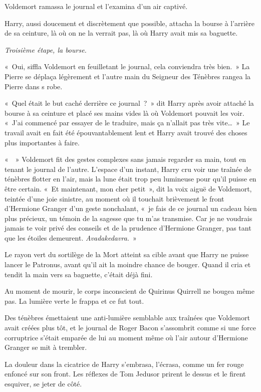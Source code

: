 Voldemort ramassa le journal et l'examina d'un air captivé.

Harry, aussi doucement et discrètement que possible, attacha la bourse à l'arrière de sa ceinture, là où on ne la verrait pas, là où Harry avait mis sa baguette.

\emph{Troisième étape, la bourse.}

«~Oui, siffla Voldemort en feuilletant le journal, cela conviendra très bien.~» La Pierre se déplaça légèrement et l'autre main du Seigneur des Ténèbres rangea la Pierre dans s robe.

«~Quel était le but caché derrière ce journal~?~» dit Harry après avoir attaché la bourse à sa ceinture et placé ses mains vides là où Voldemort pouvait les voir. «~J'ai commencé par essayer de le traduire, mais ça n'allait pas très vite…~» Le travail avait en fait été épouvantablement lent et Harry avait trouvé des choses plus importantes à faire.

«~~» Voldemort fit des gestes complexes sans jamais regarder sa main, tout en tenant le journal de l'autre. L'espace d'un instant, Harry cru voir une traînée de ténèbres flotter en l'air, mais la lune était trop peu lumineuse pour qu'il puisse en être certain. «~Et maintenant, mon cher petit~», dit la voix aiguë de Voldemort, teintée d'une joie sinistre, au moment où il touchait brièvement le front d'Hermione Granger d'un geste nonchalant, «~je fais de ce journal un cadeau bien plus précieux, un témoin de la sagesse que tu m'as transmise. Car je ne voudrais jamais te voir privé des conseils et de la prudence d'Hermione Granger, pas tant que les étoiles demeurent. \emph{Avadakedavra.}~»

Le rayon vert du sortilège de la Mort atteint sa cible avant que Harry ne puisse lancer le Patronus, avant qu'il ait la moindre chance de bouger. Quand il cria et tendit la main vers sa baguette, c'était déjà fini.

Au moment de mourir, le corps inconscient de Quirinus Quirrell ne bougea même pas. La lumière verte le frappa et ce fut tout.

Des ténèbres émettaient une anti-lumière semblable aux traînées que Voldemort avait créées plus tôt, et le journal de Roger Bacon s'assombrit comme si une force corruptrice s'était emparée de lui au moment même où l'air autour d'Hermione Granger se mit à trembler.

La douleur dans la cicatrice de Harry s'embrasa, l'écrasa, comme un fer rouge enfoncé sur son front. Les réflexes de Tom Jedusor prirent le dessus et le firent esquiver, se jeter de côté.

